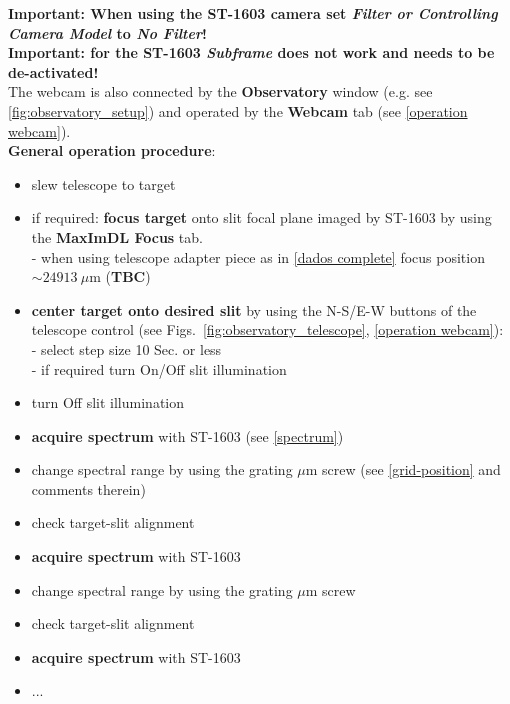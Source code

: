 \documentclass[a4paper, 11pt, fleqn]{memoir}
\begin{document}
\textbf{Important: When using the ST-1603 camera set \textit{Filter or Controlling Camera Model} to \textit{No Filter}!
}\\

\textbf{Important: for the ST-1603 \textit{Subframe} does not work and needs to be de-activated!}\\

The webcam is also connected by the \textbf{Observatory} window (e.g. see \cref{fig:observatory_setup}) and operated by the \textbf{Webcam} tab (see \cref{operation webcam}).
\\

\textbf{General operation procedure}:
\begin{itemize}
    \item
          slew telescope to target
    \item
          if required: \textbf{focus target} onto slit focal plane imaged by ST-1603 by
          using the \textbf{MaxImDL Focus} tab.\\ - when using telescope adapter piece as
          in \cref{dados complete} focus position $\sim24913~\mu$m (\textbf{TBC})
    \item
          \textbf{center target onto desired slit} by using the N-S/E-W buttons of the telescope control (see
          Figs.~\ref{fig:observatory_telescope}, \ref{operation webcam}):\\
          - select step size 10 Sec. or less\\
          - if required turn On/Off slit illumination
    \item
          turn Off slit illumination
    \item
          \textbf{acquire spectrum} with ST-1603 (see \cref{spectrum})
    \item
          change spectral range by using the grating $\mu$m screw (see \cref{grid-position} and comments therein)
    \item
          check target-slit alignment
    \item
          \textbf{acquire spectrum} with ST-1603
    \item
          change spectral range by using the grating $\mu$m screw
    \item
          check target-slit alignment
    \item
          \textbf{acquire spectrum} with ST-1603
    \item
          ...
\end{itemize}
\end{document}

